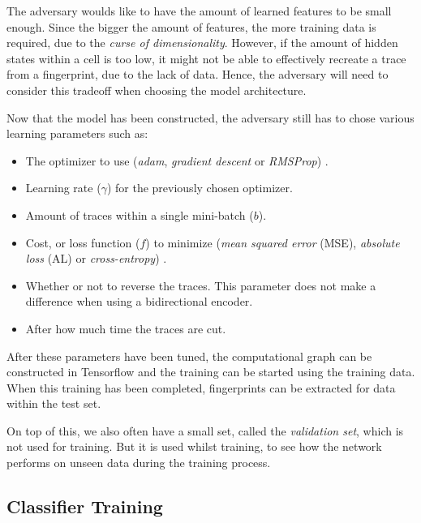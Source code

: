 The adversary woulds like to have the amount of learned features to be small enough.
Since the bigger the amount of features, the more training data is required, due to the \textit{curse of dimensionality}.
However, if the amount of hidden states within a cell is too low, it might not be able to effectively recreate a trace from a fingerprint, due to the lack of data.
Hence, the adversary will need to consider this tradeoff when choosing the model architecture.

Now that the model has been constructed, the adversary still has to chose various learning parameters such as:

\begin{itemize}
  \item The optimizer to use (\textit{adam}, \textit{gradient descent} or \textit{RMSProp}) \cite{tensorflow}.
  \item Learning rate ($\gamma$) for the previously chosen optimizer.
  \item Amount of traces within a single mini-batch ($b$).
  \item Cost, or loss function ($f$) to minimize (\textit{mean squared error} (MSE), \textit{absolute loss} (AL) or \textit{cross-entropy}) \cite{tensorflow}.
  \item Whether or not to reverse the traces. This parameter does not make a difference when using a bidirectional encoder.
  \item After how much time the traces are cut.
\end{itemize}

After these parameters have been tuned, the computational graph can be constructed in Tensorflow and the training can be started using the training data.
When this training has been completed, fingerprints can be extracted for data within the test set.

On top of this, we also often have a small set, called the \textit{validation set}, which is not used for training.
But it is used whilst training, to see how the network performs on unseen data during the training process.

\subsection{Classifier Training} \label{sec:classifier-training}

